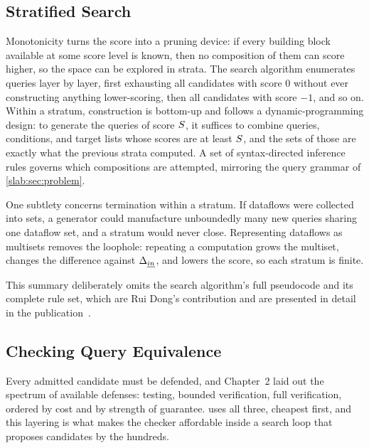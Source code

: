 \subsection{Stratified Search}
\label{slab:sec:prioritizingsearch}

Monotonicity turns the score into a pruning device: if every building
block available at some score level is known, then no composition of
them can score higher, so the space can be explored in strata. The
search algorithm enumerates queries layer by layer, first exhausting
all candidates with score $0$ without ever constructing anything
lower-scoring, then all candidates with score $-1$, and so on. Within
a stratum, construction is bottom-up and follows a dynamic-programming
design: to generate the queries of score $S$, it suffices to
combine queries, conditions, and target lists whose scores are at
least $S$, and the sets of those are exactly what the previous
strata computed. A set of syntax-directed inference rules governs
which compositions are attempted, mirroring the query grammar of
\cref{slab:sec:problem}.

One subtlety concerns termination within a stratum. If dataflows were
collected into sets, a generator could manufacture unboundedly many
new queries sharing one dataflow set, and a stratum would never close.
Representing dataflows as multisets removes the loophole: repeating a
computation grows the multiset, changes the difference against
$\Delta_{\emph{in}}$, and lowers the score, so each stratum is
finite.

This summary deliberately omits the search algorithm's full pseudocode
and its complete rule set, which are Rui Dong's contribution and are
presented in detail in the publication~\cite{dong2023slabcity}.

\subsection{Checking Query Equivalence}
\label{slab:sec:checkingequiv}

Every admitted candidate must be defended, and Chapter~2 laid out the
spectrum of available defenses: testing, bounded verification, full
verification, ordered by cost and by strength of guarantee. \slabcity
uses all three, cheapest first, and this layering is what makes the
checker affordable inside a search loop that proposes candidates by
the hundreds.

